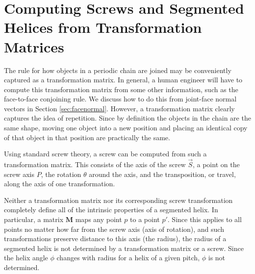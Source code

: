 \documentclass{svproc}
\begin{document}



\section{Computing Screws and Segmented Helices from Transformation Matrices}
\label{sec:screws}

The rule for how objects in a periodic chain are joined may be
conveniently captured as a transformation
matrix.
In general, a human engineer will have to compute this transformation matrix from some other
information, such as the face-to-face conjoining rule.
We discuss how to do this from joint-face normal
vectors in Section \ref{sec:facenormal}. However, a transformation matrix clearly
captures the idea of repetition.
Since by definition the objects in the chain are the same shape,
moving one object into a new position and placing an identical copy of that object in that position
are practically the same.

Using standard screw theory\cite{wittenburg2016kinematics},
a screw can be computed from such
a transformation matrix. This consists of the axis of the screw $\overrightarrow{S}$,
a point on the screw axis $P$,
the rotation $\theta$ around the axis, and the
transposition, or travel, along the axis of one transformation.

Neither a transformation matrix nor its corresponding screw transformation
completely define all of the intrinsic
properties of a segmented helix. In particular, a matrix $\bm{M}$ maps any point $p$ to a point $p'$.
Since this applies to all points no matter how far from the screw axis (axis of rotation), and
such transformations preserve distance to this axis (the radius), the radius of a segmented helix
is not determined by a transformation matrix or a screw. Since the helix angle $\phi$ changes
with radius for a helix of a given pitch, $\phi$ is not determined.
\end{document}
